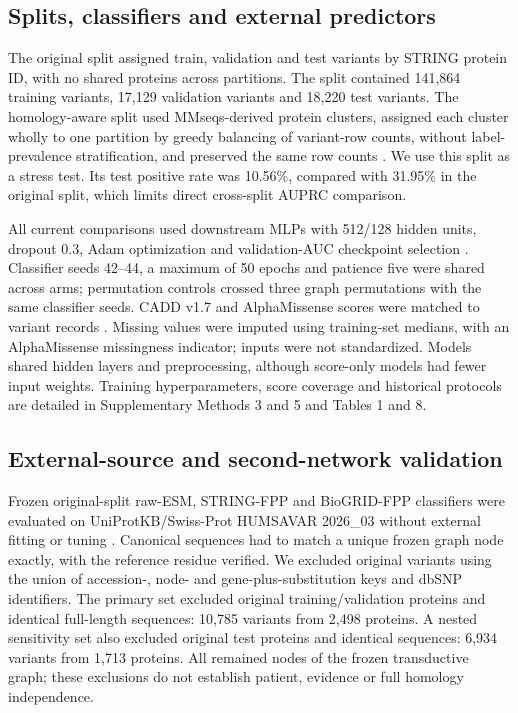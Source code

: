 \documentclass[conference]{IEEEtran}
\begin{document}
\subsection{Splits, classifiers and external predictors}

The original split assigned train, validation and test variants by STRING protein ID, with no shared proteins across partitions. The split contained 141,864 training variants, 17,129 validation variants and 18,220 test variants. The homology-aware split used MMseqs-derived protein clusters, assigned each cluster wholly to one partition by greedy balancing of variant-row counts, without label-prevalence stratification, and preserved the same row counts \cite{Steinegger2017MMseqs2}. We use this split as a stress test. Its test positive rate was 10.56\%, compared with 31.95\% in the original split, which limits direct cross-split AUPRC comparison.

All current comparisons used downstream MLPs with 512/128 hidden units, dropout 0.3, Adam optimization and validation-AUC checkpoint selection \cite{Kingma2015Adam}. Classifier seeds 42--44, a maximum of 50 epochs and patience five were shared across arms; permutation controls crossed three graph permutations with the same classifier seeds. CADD v1.7 and AlphaMissense scores were matched to variant records \cite{Schubach2024CADDv17,Cheng2023AlphaMissense}. Missing values were imputed using training-set medians, with an AlphaMissense missingness indicator; inputs were not standardized. Models shared hidden layers and preprocessing, although score-only models had fewer input weights. Training hyperparameters, score coverage and historical protocols are detailed in Supplementary Methods 3 and 5 and Tables 1 and 8.

\subsection{External-source and second-network validation}

Frozen original-split raw-ESM, STRING-FPP and BioGRID-FPP classifiers were evaluated on UniProtKB/Swiss-Prot HUMSAVAR 2026\_03 without external fitting or tuning \cite{UniProt2025}. Canonical sequences had to match a unique frozen graph node exactly, with the reference residue verified. We excluded original variants using the union of accession-, node- and gene-plus-substitution keys and dbSNP identifiers. The primary set excluded original training/validation proteins and identical full-length sequences: 10,785 variants from 2,498 proteins. A nested sensitivity set also excluded original test proteins and identical sequences: 6,934 variants from 1,713 proteins. All remained nodes of the frozen transductive graph; these exclusions do not establish patient, evidence or full homology independence.
\end{document}
